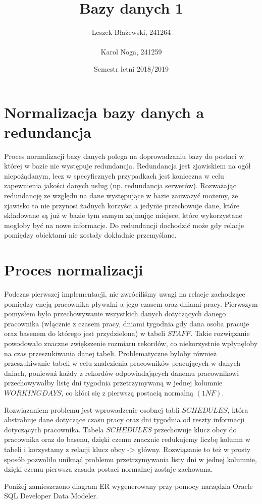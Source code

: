 \documentclass[a4paper]{article}
\title{Bazy danych 1}
\author{Leszek Błażewski, 241264 \\ \\Karol Noga, 241259}
\date{Semestr letni 2018/2019}
\begin{document}
\maketitle

\newpage

\section{Normalizacja bazy danych a redundancja}

Proces normalizacji bazy danych polega na doprowadzaniu bazy do postaci w której w bazie nie występuje redundancja. Redundancja jest zjawiskiem na ogół niepożądanym, lecz w specyficznych przypadkach jest konieczna w celu zapewnienia jakości danych usług (np. redundancja serwerów). Rozważając redundancję ze względu na dane występujące w bazie zauważyć możemy, że zjawisko to nie przynosi żadnych korzyści a jedynie przechowuje dane, które składowane są już w bazie tym samym zajmując miejsce, które wykorzystane mogłoby być na nowe informacje. Do redundancji dochodzić może gdy relacje pomiędzy obiektami nie zostały dokładnie przemyślane.

\section{Proces normalizacji}

Podczas pierwszej implementacji, nie zwróciliśmy uwagi na relacje zachodzące pomiędzy encją pracownika pływalni a jego czasem oraz dniami pracy. Pierwszym pomysłem było przechowywanie wszystkich danych dotyczących danego pracownika (włącznie z czasem pracy, dniami tygodnia gdy dana osoba pracuje oraz basenem do którego jest przydzielona) w tabeli $STAFF$. Takie rozwiązanie powodowało znaczne zwiększenie rozmiaru rekordów, co niekorzystnie wpłynęłoby na czas przeszukiwania danej tabeli. Problematyczne byłoby również przeszukiwanie tabeli w celu znalezienia pracowników pracujących w danych dniach, ponieważ każdy z rekordów odpowiadających danemu pracownikowi przechowywałby listę dni tygodnia przetrzymywaną w jednej kolumnie $WORKINGDAYS$, co kłóci się z pierwszą postacią normalną $(1NF)$.

\vspace{5mm}
Rozwiązaniem problemu jest wprowadzenie osobnej tabli $SCHEDULES$, która abstrahuje dane dotyczące czasu pracy oraz dni tygodnia od reszty informacji dotyczących pracownika. Tabela $SCHEDULES$ przechowuje klucz obcy do pracownika oraz do basenu, dzięki czemu znacznie redukujemy liczbę kolumn w tabeli i korzystamy z relacji klucz obcy -> główny. Rozwiązanie to też w prosty sposób pozwoliło uniknąć problemu przetrzymywania listy dni w jednej kolumnie, dzięki czemu pierwsza zasada postaci normalnej zostaje zachowana.

\vspace{5mm}
Poniżej zamieszczono diagram ER wygenerowany przy pomocy narzędzia Oracle SQL Developer Data Modeler.
\newpage
{}
\recalctypearea

\end{document}
